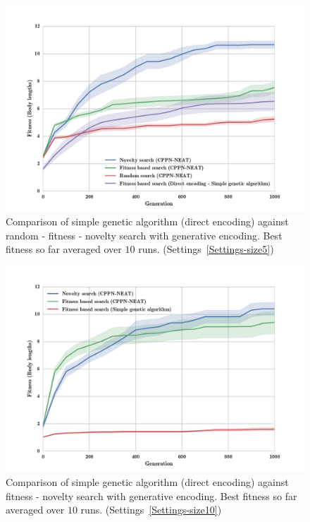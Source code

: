 \begin{figure}[t!]
\centering
\includegraphics[width=1.0\textwidth]{../Figures/Results/FitNovRandomDirectSize5.pdf}
\caption{Comparison of simple genetic algorithm (direct encoding) against random - fitness - novelty search with generative encoding. Best fitness so far averaged over $10$ runs. (Settings~\ref{Settings-size5})}
\label{fig:FitNovRandomDirectSize5}
\end{figure}

\begin{figure}[t!]
\centering
\includegraphics[width=1.0\textwidth]{../Figures/Results/FitvsNovVsDirSize10.pdf}
\caption{Comparison of simple genetic algorithm (direct encoding) against fitness - novelty search with generative encoding. Best fitness so far averaged over $10$ runs. (Settings~\ref{Settings-size10})}
\label{fig:FitvsNovVsDirSize10}
\end{figure}

